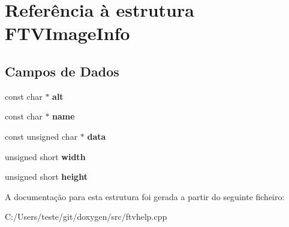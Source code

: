 \hypertarget{struct_f_t_v_image_info}{\section{Referência à estrutura F\-T\-V\-Image\-Info}
\label{struct_f_t_v_image_info}
}
\subsection*{Campos de Dados}
\begin{DoxyCompactItemize}
\item 
\hypertarget{struct_f_t_v_image_info_afe608fa398c7860414524eb994d542a2}{const char $\ast$ {\bfseries alt}}\label{struct_f_t_v_image_info_afe608fa398c7860414524eb994d542a2}

\item 
\hypertarget{struct_f_t_v_image_info_a8f8f80d37794cde9472343e4487ba3eb}{const char $\ast$ {\bfseries name}}\label{struct_f_t_v_image_info_a8f8f80d37794cde9472343e4487ba3eb}

\item 
\hypertarget{struct_f_t_v_image_info_afb8a18b1a8a5a679a5c4bbb52769b49e}{const unsigned char $\ast$ {\bfseries data}}\label{struct_f_t_v_image_info_afb8a18b1a8a5a679a5c4bbb52769b49e}

\item 
\hypertarget{struct_f_t_v_image_info_a8a31e3e5c2765d45488c75c00bacfefd}{unsigned short {\bfseries width}}\label{struct_f_t_v_image_info_a8a31e3e5c2765d45488c75c00bacfefd}

\item 
\hypertarget{struct_f_t_v_image_info_aa8e4172ede7827e837ac528eae04c497}{unsigned short {\bfseries height}}\label{struct_f_t_v_image_info_aa8e4172ede7827e837ac528eae04c497}

\end{DoxyCompactItemize}


A documentação para esta estrutura foi gerada a partir do seguinte ficheiro\-:\begin{DoxyCompactItemize}
\item 
C\-:/\-Users/teste/git/doxygen/src/ftvhelp.\-cpp\end{DoxyCompactItemize}
